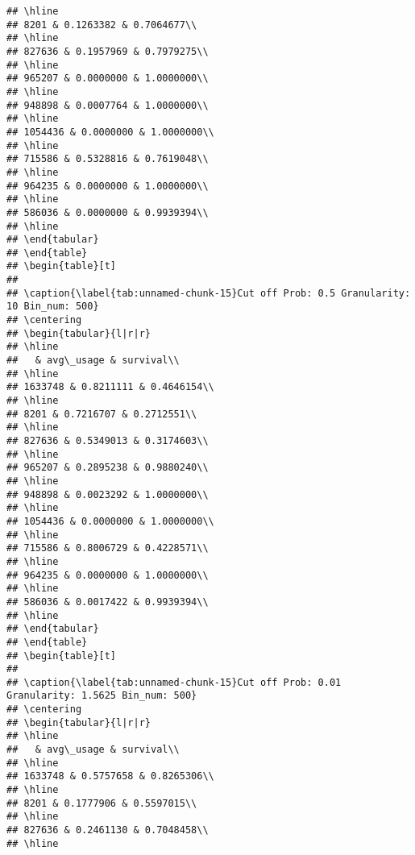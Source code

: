 \documentclass[]{article}
\begin{document}
\begin{verbatim}
## \hline
## 8201 & 0.1263382 & 0.7064677\\
## \hline
## 827636 & 0.1957969 & 0.7979275\\
## \hline
## 965207 & 0.0000000 & 1.0000000\\
## \hline
## 948898 & 0.0007764 & 1.0000000\\
## \hline
## 1054436 & 0.0000000 & 1.0000000\\
## \hline
## 715586 & 0.5328816 & 0.7619048\\
## \hline
## 964235 & 0.0000000 & 1.0000000\\
## \hline
## 586036 & 0.0000000 & 0.9939394\\
## \hline
## \end{tabular}
## \end{table}
## \begin{table}[t]
## 
## \caption{\label{tab:unnamed-chunk-15}Cut off Prob: 0.5 Granularity: 10 Bin_num: 500}
## \centering
## \begin{tabular}{l|r|r}
## \hline
##   & avg\_usage & survival\\
## \hline
## 1633748 & 0.8211111 & 0.4646154\\
## \hline
## 8201 & 0.7216707 & 0.2712551\\
## \hline
## 827636 & 0.5349013 & 0.3174603\\
## \hline
## 965207 & 0.2895238 & 0.9880240\\
## \hline
## 948898 & 0.0023292 & 1.0000000\\
## \hline
## 1054436 & 0.0000000 & 1.0000000\\
## \hline
## 715586 & 0.8006729 & 0.4228571\\
## \hline
## 964235 & 0.0000000 & 1.0000000\\
## \hline
## 586036 & 0.0017422 & 0.9939394\\
## \hline
## \end{tabular}
## \end{table}
## \begin{table}[t]
## 
## \caption{\label{tab:unnamed-chunk-15}Cut off Prob: 0.01 Granularity: 1.5625 Bin_num: 500}
## \centering
## \begin{tabular}{l|r|r}
## \hline
##   & avg\_usage & survival\\
## \hline
## 1633748 & 0.5757658 & 0.8265306\\
## \hline
## 8201 & 0.1777906 & 0.5597015\\
## \hline
## 827636 & 0.2461130 & 0.7048458\\
## \hline

\end{verbatim}
\end{document}
